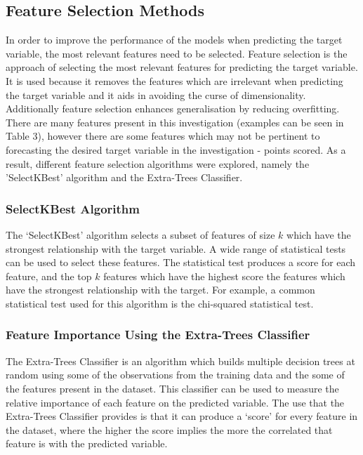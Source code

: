 \documentclass[a4paper,11pt,twoside]{article}
\begin{document}
\subsection{Feature Selection Methods}
In order to improve the performance of the models when predicting the target variable, the most relevant features need to be selected. Feature selection is the approach of selecting the most relevant features for predicting the target variable. It is used because it removes the features which are irrelevant when predicting the target variable and it aids in avoiding the curse of dimensionality. Additionally feature selection enhances generalisation by reducing overfitting. There are many features present in this investigation (examples can be seen in Table 3), however there are some features which may not be pertinent to forecasting the desired target variable in the investigation - points scored. As a result, different feature selection algorithms were explored, namely the 'SelectKBest' algorithm and the Extra-Trees Classifier.


\subsubsection{SelectKBest Algorithm}
The `SelectKBest' algorithm selects a subset of features of size $k$ which have the strongest relationship with the target variable. A wide range of statistical tests can be used to select these features. The statistical test produces a score for each feature, and the top $k$ features which have the highest score the features which have the strongest relationship with the target. For example, a common statistical test used for this algorithm is the chi-squared statistical test.  

 \subsubsection{Feature Importance Using the Extra-Trees Classifier}
 The Extra-Trees Classifier is an algorithm which builds multiple decision trees at random using some of the observations from the training data and the some of the features present in the dataset. This classifier can be used to measure the relative importance of each feature on the predicted variable. The use that the Extra-Trees Classifier provides is that it can produce a `score' for every feature in the dataset, where the higher the score implies the more the correlated that feature is with the predicted variable.
\end{document}
